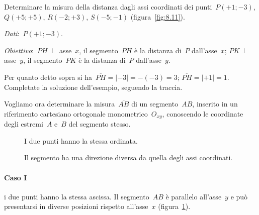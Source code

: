 \begin{figure}[b]
 \begin{minipage}[t]{.45\textwidth}
 \centering
 \caption{}\label{fig:8.11}
 \end{minipage}\hfil
 \begin{minipage}[t]{.45\textwidth}
 \centering
 \caption{}\label{fig:8.12}
 \end{minipage}
 \end{figure}
\pagebreak
\begin{exrig}
 \begin{esempio}
 \label{ex:8.14}
Determinare la misura della distanza dagli assi coordinati dei punti~$P(+1;-3)$, $Q(+5;+5)$, $R(-2;+3)$, $S(-5;-1)$ (figura~\ref{fig:8.11}).

\emph{Dati}:~$P(+1;-3)$.

\emph{Obiettivo}:~$PH\perp$ asse~$x$, il segmento~$PH$ è la distanza di~$P$ dall'asse~$x$;
$PK\perp$ asse~$y$, il segmento~$PK$ è la distanza di~$P$ dall'asse~$y$.

Per quanto detto sopra si ha~$\overline{PH}=|-3|=-(-3)=3$; $\overline{PH}=|+1|=1$.
Completate la soluzione dell'esempio, seguendo la traccia.
 \end{esempio}
\end{exrig}

Vogliamo ora determinare la misura~$\overline{AB}$ di un segmento~$AB$, inserito in un riferimento cartesiano ortogonale
monometrico~$O_{xy}$, conoscendo le coordinate degli estremi~$A$ e~$B$ del segmento stesso.

\begin{figure}[t]
 \begin{minipage}[t]{.45\textwidth}
 \centering
 \caption{I due punti hanno la stessa ordinata.}\label{fig:8.13}
 \end{minipage}\hfil
 \begin{minipage}[t]{.45\textwidth}
 \centering
 \caption{Il segmento ha una direzione diversa da quella degli assi coordinati.}\label{fig:8.14}
 \end{minipage}
 \end{figure}

\paragraph{Caso I} i due punti hanno la stessa ascissa. Il segmento~$AB$ è parallelo all'asse~$y$ e può
presentarsi in diverse posizioni rispetto all'asse~$x$ (figura~\ref{fig:8.12}).

